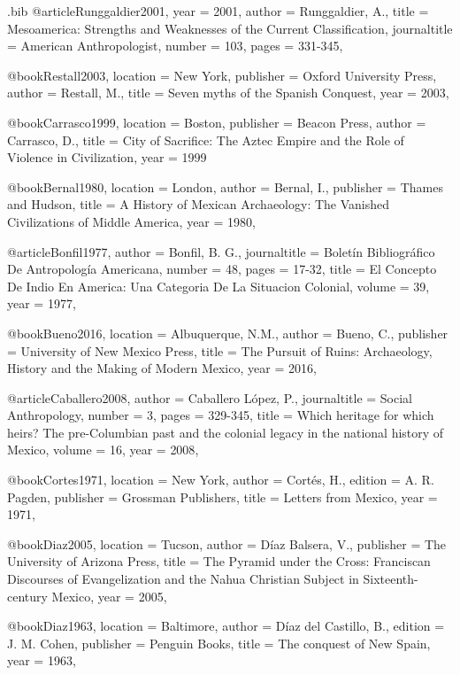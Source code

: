 \begin{filecontents}{\IJSRAidentifier.bib}
@article{Runggaldier2001,
year = {2001},
author = {Runggaldier, A.},
title = {Mesoamerica: Strengths and Weaknesses of the Current Classification},
journaltitle = {American Anthropologist},
number = {103},
pages = {331-345},
}

@book{Restall2003,
	location = {New York},
	publisher = {Oxford University Press},
	author = {Restall, M.},
	title = {Seven myths of the Spanish Conquest},
	year = {2003},
}

@book{Carrasco1999,
location = {Boston},
publisher = {Beacon Press},
author = {Carrasco, D.},
title = {City of Sacrifice: The Aztec Empire and the Role of Violence in Civilization},
year = {1999}
}

@book{Bernal1980,
location =  {London},
author = {Bernal, I.},
publisher = {Thames and Hudson},
title = {A History of Mexican Archaeology: The Vanished Civilizations of Middle America},
year = {1980},
}


@article{Bonfil1977,
author = {Bonfil, B. G.},
journaltitle =  {Boletín Bibliográfico De Antropología Americana},
number = {48},
pages = {17-32},
title = {El Concepto De Indio En America: Una Categoria De La Situacion Colonial},
volume = {39},
year = {1977},
}


@book{Bueno2016,
location =  {Albuquerque, N.M.},
author = {Bueno, C.},
publisher = {University of New Mexico Press},
title = {The Pursuit of Ruins: Archaeology, History and the Making of Modern Mexico},
year = {2016},
}


@article{Caballero2008,
author = {Caballero López, P.},
journaltitle =  {Social Anthropology},
number = {3},
pages = {329-345},
title = {Which heritage for which heirs? The pre-Columbian past and the colonial legacy in the national history of Mexico},
volume = {16},
year = {2008},
}


@book{Cortes1971,
location =  {New York},
author = {Cortés, H.},
edition = {A. R. Pagden},
publisher = {Grossman Publishers},
title = {Letters from Mexico},
year = {1971},
}


@book{Diaz2005,
location =  {Tucson},
author = {Díaz Balsera, V.},
publisher = {The University of Arizona Press},
title = {The Pyramid under the Cross: Franciscan Discourses of Evangelization and the Nahua Christian Subject in Sixteenth-century Mexico},
year = {2005},
}


@book{Diaz1963,
location =  {Baltimore},
author = {Díaz del Castillo, B.},
edition = {J. M. Cohen},
publisher = {Penguin Books},
title = {The conquest of New Spain},
year = {1963},
}



\end{filecontents}
